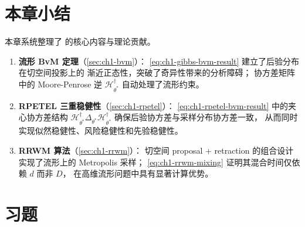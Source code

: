 \section{本章小结}\label{sec:ch1-summary}

本章系统整理了 \citep{tang2023robust} 的核心内容与理论贡献。

\begin{enumerate}
    \item \textbf{流形 BvM 定理}（\cref{sec:ch1-bvm}）：
          \cref{eq:ch1-gibbs-bvm-result} 建立了后验分布在切空间投影上的
          渐近正态性，突破了奇异性带来的分析障碍；
          协方差矩阵中的 Moore-Penrose 逆 $\mathcal{H}_{\theta^*}^\dagger$
          自动处理了流形约束。
    \item \textbf{RPETEL 三重稳健性}（\cref{sec:ch1-rpetel}）：
          \cref{eq:ch1-rpetel-bvm-result} 中的夹心协方差结构
          $\mathcal{H}_{\theta^*}^\dagger\Delta_{\theta^*}
           \mathcal{H}_{\theta^*}^\dagger$
          确保后验协方差与采样分布协方差一致，
          从而同时实现似然稳健性、风险稳健性和先验稳健性。
    \item \textbf{RRWM 算法}（\cref{sec:ch1-rrwm}）：
          切空间 proposal + retraction 的组合设计
          实现了流形上的 Metropolis 采样；
          \cref{eq:ch1-rrwm-mixing} 证明其混合时间仅依赖 $d$ 而非 $D$，
          在高维流形问题中具有显著计算优势。
\end{enumerate}


\section{习题}\label{sec:ch1-exercises}

